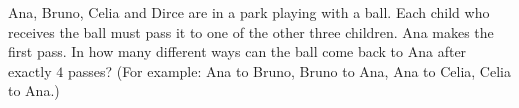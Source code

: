 Ana, Bruno, Celia and Dirce are in a park playing with a ball. Each child who receives the ball must pass it to one of the other three children. Ana makes the first pass. In how many different ways can the ball come back to Ana after exactly $4$ passes? (For example: Ana to Bruno, Bruno to Ana, Ana to Celia, Celia to Ana.)
